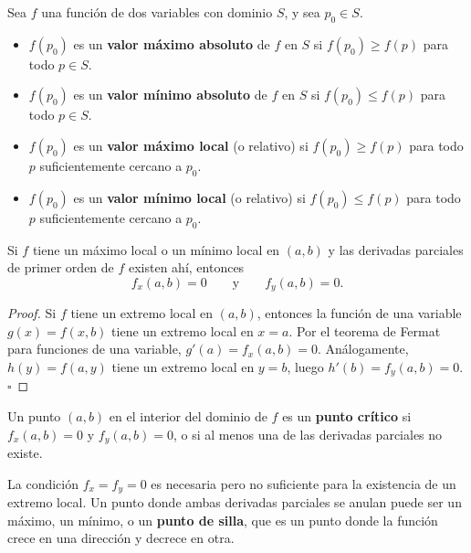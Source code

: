 \begin{definition}
Sea $f$ una función de dos variables con dominio $S$, y sea
$p_0\in S$.
\begin{itemize}
    \item $f(p_0)$ es un \textbf{valor máximo absoluto} de $f$ en $S$ si
    $f(p_0) \geq f(p)$ para todo $p\in S$.
    \item $f(p_0)$ es un \textbf{valor mínimo absoluto} de $f$ en $S$ si
    $f(p_0) \leq f(p)$ para todo $p\in S$.
    \item $f(p_0)$ es un \textbf{valor máximo local} (o relativo) si
    $f(p_0) \geq f(p)$ para todo $p$ suficientemente cercano a $p_0$.
    \item $f(p_0)$ es un \textbf{valor mínimo local} (o relativo) si
    $f(p_0) \leq f(p)$ para todo $p$ suficientemente cercano a $p_0$.
\end{itemize}
\end{definition}

\begin{theorem}
Si $f$ tiene un máximo local o un mínimo local en $(a,b)$ y las
derivadas parciales de primer orden de $f$ existen ahí, entonces
\[
f_x(a,b) = 0 \qquad\text{y}\qquad f_y(a,b) = 0.
\]
\end{theorem}

\begin{proof}
Si $f$ tiene un extremo local en $(a,b)$, entonces la función de una
variable $g(x) = f(x,b)$ tiene un extremo local en $x=a$. Por el
teorema de Fermat para funciones de una variable, $g'(a)=f_x(a,b)=0$.
Análogamente, $h(y)=f(a,y)$ tiene un extremo local en $y=b$, luego
$h'(b)=f_y(a,b)=0$. $\square$
\end{proof}

\begin{definition}
Un punto $(a,b)$ en el interior del dominio de $f$ es un
\textbf{punto crítico} si $f_x(a,b)=0$ y $f_y(a,b)=0$, o si al menos
una de las derivadas parciales no existe.
\end{definition}

\begin{rem}
La condición $f_x=f_y=0$ es necesaria pero no suficiente para la
existencia de un extremo local. Un punto donde ambas derivadas parciales
se anulan puede ser un máximo, un mínimo, o un \textbf{punto de silla},
que es un punto donde la función crece en una dirección y decrece en
otra.
\end{rem}

